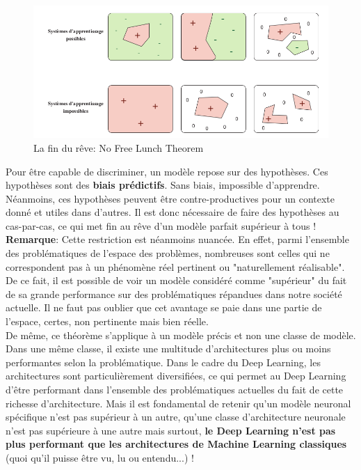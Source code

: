 \begin{figure}
    \centering
    \includegraphics[scale=0.3]{./tex/induction/no_free.png}
    \caption{La fin du rêve: No Free Lunch Theorem}
    \label{no_free}
\end{figure}
\noindent Pour être capable de discriminer, un modèle repose sur des hypothèses. Ces hypothèses sont des \textbf{biais prédictifs}. Sans biais, impossible d'apprendre. Néanmoins, ces hypothèses peuvent être contre-productives pour un contexte donné et utiles dans d'autres. Il est donc nécessaire de faire des hypothèses au cas-par-cas, ce qui met fin au rêve d'un modèle parfait supérieur à tous !\\

\noindent \textbf{Remarque}: Cette restriction est néanmoins nuancée. En effet, parmi l'ensemble des problématiques de l'espace des problèmes, nombreuses sont celles qui ne correspondent pas à un phénomène réel pertinent ou "naturellement réalisable". De ce fait, il est possible de voir un modèle considéré comme "supérieur" du fait de sa grande performance sur des problématiques répandues dans notre société actuelle. Il ne faut pas oublier que cet avantage se paie dans une partie de l'espace, certes, non pertinente mais bien réelle. \\

\noindent De même, ce théorème s'applique à un modèle précis et non une classe de modèle. Dans une même classe, il existe une multitude d'architectures plus ou moins performantes selon la problématique. Dans le cadre du Deep Learning, les architectures sont particulièrement diversifiées, ce qui permet au Deep Learning d'être performant dans l'ensemble des problématiques actuelles du fait de cette richesse d'architecture. Mais il est fondamental de retenir qu'un modèle neuronal spécifique n'est pas supérieur à un autre, qu'une classe d'architecture neuronale n'est pas supérieure à une autre mais surtout, \textbf{le Deep Learning n'est pas plus performant que les architectures de Machine Learning classiques} (quoi qu'il puisse être vu, lu ou entendu...) !
